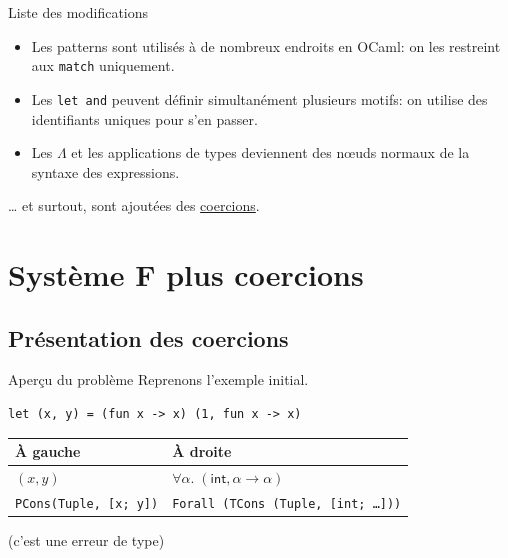 \documentclass[final]{beamer}
\begin{document}
\begin{frame}{Liste des modifications}

  \begin{itemize}
    \item Les patterns sont utilisés à de nombreux endroits en OCaml: on les
      restreint aux \texttt{match} uniquement.
    \item Les \texttt{let and} peuvent définir simultanément plusieurs motifs:
      on utilise des identifiants uniques pour s'en passer.
    \item Les $\Lambda$ et les applications de types deviennent des nœuds
      normaux de la syntaxe des expressions.
  \end{itemize}
  … et surtout, sont ajoutées des \underline{coercions}.

\end{frame}

\section{Système F plus coercions}

\subsection{Présentation des coercions}

\begin{frame}[fragile]{Aperçu du problème}
Reprenons l'exemple initial.

\begin{verbatim}
let (x, y) = (fun x -> x) (1, fun x -> x)
\end{verbatim}

\begin{tabular}{l|l}
  À gauche & À droite\\
\hline
$(x, y)$ & $\forall \alpha.\; (\mathsf{int}, \alpha \to \alpha)$ \\
\texttt{PCons(Tuple, [x; y])} &
\texttt{Forall (TCons (Tuple, [int; …]))}
\end{tabular}

\vspace{2ex}


\begin{flushright}
  (c'est une erreur de type)
\end{flushright}

\end{frame}
\end{document}
